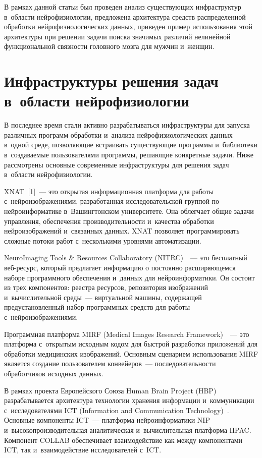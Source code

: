 \begin{multicols}{2}
    В рамках данной статьи был проведен анализ существующих 
инфраструктур в~области нейрофизиологии, предложена архитектура средств 
распределенной обработки нейрофизиологических данных, приведен пример 
использования этой архитектуры при решении задачи поиска значимых 
различий нелинейной функциональной связности головного мозга для 
мужчин и~женщин.
{

}
    
\section{Инфраструктуры решения задач в~области 
нейрофизиологии}

    В последнее время стали активно разрабатываться инфраструктуры для 
запуска различных программ обработки и~анализа нейрофизиологических 
данных в~одной среде, позволяющие встраивать существующие программы 
и~библиотеки в~создаваемые пользователями программы, решающие 
конкретные задачи. Ниже рассмотрены основные современные 
инфраструктуры для решения задач в~области нейрофизиологии.
    
    XNAT~[1]~--- это открытая информационная платформа для работы 
с~нейроизображениями, разработанная исследовательской группой по 
нейроинформатике в~Вашингтонском университете. Она облегчает общие 
задачи управления, обеспечения производительности и~качества обработки 
нейроизображений и~связанных данных. XNAT позволяет программировать 
сложные потоки работ с~несколькими уровнями автоматизации.
    
    NeuroImaging Tools \& Resources Collaboratory (NITRC)~\cite{2-st}~---  
это бесплатный веб-ре\-сурс, который предлагает информацию о постоянно 
расширяющемся наборе программного обеспечения и~данных для 
нейроинформатики. Он состоит из трех компонентов: реестра ресурсов, 
репозитория изображений и~вычислительной среды~--- виртуальной 
машины, содержащей предустановленный набор программных средств для 
работы с~нейроизображениями.
    
    Программная платформа MIRF (Medical Images Research 
Framework)~\cite{4-st}~---  это платформа с~открытым исходным кодом для 
быстрой разработки приложений для обработки медицинских изображений. 
Основным сценарием использования MIRF является создание пользователем 
конвейеров~--- последовательности обработчиков исходных данных. 
    
    В рамках проекта Европейского Союза Human Brain Project 
(HBP)~\cite{5-st} разрабатывается архитектура технологии хранения 
информации и~коммуникации с~исследователями ICT (Information and 
Communication Technology)~\cite{3-st}. Основные компоненты ICT~--- 
платформа нейроинформатики NIP и~высокопроизводительная аналитическая и~вы\-чис\-ли\-тель\-ная 
платформа HPAC. Компонент \mbox{COLLAB} обеспечивает 
взаимодействие как между компонентами ICT, так и~взаимодействие 
исследователей с~ICT.
    

\end{multicols}
